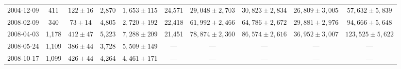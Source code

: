 \begin{landscape}
\begin{longtable}{cccccccccc}
{2004-12-09} & 411 & {$122  \pm  16$} & 2,870 & {$1,653 \pm 115$} & 24,571 & {$29,048 \pm 2,703$} & {$30,823 \pm 2,834$} & {$26,809 \pm 3,005$} & {$57,632 \pm 5,839$} \\
{2008-02-09} & 340 & {$73  \pm  14$} & 4,805 & {$2,720 \pm 192$} & 22,418 & {$61,992 \pm 2,466$} & {$64,786 \pm 2,672$} & {$29,881 \pm 2,976$} & {$94,666 \pm 5,648$} \\
{2008-04-03} & 1,178 & {$412  \pm  47$} & 5,223 & {$7,288 \pm 209$} & 21,451 & {$78,874 \pm 2,360$} & {$86,574 \pm 2,616$} & {$36,952 \pm 3,007$} & {$123,525 \pm 5,622$} \\
{2008-05-24} & 1,109 & {$386  \pm  44$} & 3,728 & {$5,509 \pm 149$} & --- & --- & --- & --- & --- \\
{2008-10-17} & 1,099 & {$426  \pm  44$} & 4,264 & {$4,461 \pm 171$} & --- & --- & --- & --- & --- \\
\end{longtable} 
\end{landscape} 
